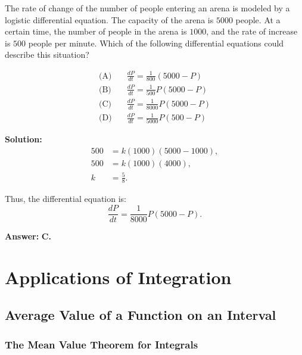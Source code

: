 \documentclass[12pt]{article}
\theoremstyle{beautifulthm}
\begin{document}
\begin{tcolorbox}[colback=examplebg, colframe=red!75!black, title=\textbf{EXAMPLE 2: Logistics Differential Equation}, fonttitle=\bfseries, sharp corners]

The rate of change of the number of people entering an arena is modeled by a logistic differential equation. The capacity of the arena is $5000$ people. At a certain time, the number of people in the arena is $1000$, and the rate of increase is $500$ people per minute. Which of the following differential equations could describe this situation?

\[
\begin{aligned}
    \text{(A)} & \quad \frac{dP}{dt} = \frac{1}{800} (5000 - P) \\
    \text{(B)} & \quad \frac{dP}{dt} = \frac{1}{500} P (5000 - P) \\
    \text{(C)} & \quad \frac{dP}{dt} = \frac{1}{8000} P (5000 - P) \\
    \text{(D)} & \quad \frac{dP}{dt} = \frac{1}{5000} P (500 - P)
\end{aligned}
\]




\tcblower
\textbf{Solution:} 
\begin{align*}
    500 &= k(1000)(5000 - 1000), \\
    500 &= k(1000)(4000), \\
    k &= \frac{5}{8}.
\end{align*}

Thus, the differential equation is:
\[
\frac{dP}{dt} = \frac{1}{8000}P(5000 - P).
\]

\textbf{Answer:} \textbf{C.}
\end{tcolorbox}

\newpage

\section{Applications of Integration}


\subsection{Average
Value of a Function on an
Interval}

\subsubsection{The Mean Value Theorem for Integrals}
\end{document}
